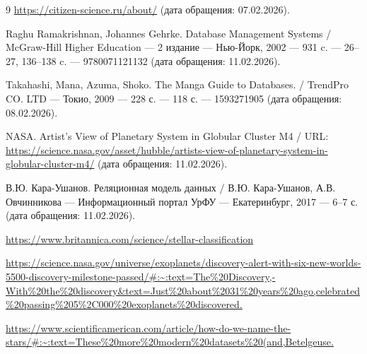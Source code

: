 \documentclass[14pt,a4paper]{extarticle}
\begin{document}
\begin{thebibliography}{9}
		 \url{https://citizen-science.ru/about/} (дата обращения: 07.02.2026).
		
		 Raghu Ramakrishnan, Johannes Gehrke. Database Management Systems / McGraw-Hill Higher Education --- 2 издание --- Нью-Йорк, 2002 --- 931 c. --- 26--27, 136--138 c. --- 9780071121132 (дата обращения: 11.02.2026).
		
		 Takahashi, Mana, Azuma, Shoko. The Manga Guide to Databases. / TrendPro CO. LTD --- Токио, 2009 --- 228 с. --- 118 с. --- 1593271905 (дата обращения: 08.02.2026).
		
		 NASA. Artist’s View of Planetary System in Globular Cluster M4 / URL: \url{https://science.nasa.gov/asset/hubble/artists-view-of-planetary-system-in-globular-cluster-m4/} (дата обращения: 11.02.2026).
		
		 В.Ю. Кара-Ушанов. Реляционная модель данных / В.Ю. Кара-Ушанов, А.В. Овчинникова --- Информационный портал УрФУ --- Екатеринбург, 2017 --- 6--7 с. (дата обращения: 11.02.2026).
		
		 \url{https://www.britannica.com/science/stellar-classification}
		
		 \url{https://science.nasa.gov/universe/exoplanets/discovery-alert-with-six-new-worlds-5500-discovery-milestone-passed/#:~:text=The%20Discovery,-With%20the%20discovery&text=Just%20about%2031%20years%20ago,celebrated%20passing%205%2C000%20exoplanets%20discovered.}
		
		 \url{https://www.scientificamerican.com/article/how-do-we-name-the-stars/#:~:text=These%20more%20modern%20datasets%20(and,Betelgeuse.}
	\end{thebibliography}
\end{document}
